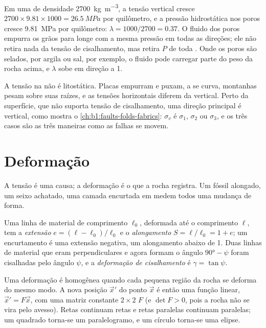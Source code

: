 Em uma  de densidade \qty{2700}{kg.m^{-3}}, a tensão vertical cresce $2700\times9.81\times1000 = \qty{26.5}{MPa}$ por quilômetro, e a pressão hidrostática nos poros cresce \qty{9.81}{MPa} por quilômetro: $\lambda = 1000/2700 = 0.37$. O fluido dos poros empurra os grãos para longe com a mesma pressão em todas as direções; ele não retira nada da tensão de cisalhamento, mas retira $P$ de toda . Onde os poros são selados, por argila ou sal, por exemplo, o fluido pode carregar parte do peso da rocha acima, e $\lambda$ sobe em direção a 1.

A tensão na  não é litostática. Placas empurram e puxam, a  se curva, montanhas pesam sobre suas raízes, e as tensões horizontais diferem da vertical. Perto da superfície, que não suporta tensão de cisalhamento, uma direção principal é vertical, como mostra o \cref{ch:b1:faults-folds-fabrics}: $\sigma_v$ é $\sigma_1$, $\sigma_2$ ou $\sigma_3$, e os três casos são as três maneiras como as falhas se movem.

\section{Deformação}\label{sec:b1:stress-strain-rheology:strain}

A tensão é uma causa; a deformação é o que a rocha registra. Um fóssil alongado, um seixo achatado, uma camada encurtada em  medem todos uma mudança de forma.

\begin{definition}\label{def:b1:stress-strain-rheology:strain}
Uma linha de material de comprimento $\ell_0$, deformada até o comprimento $\ell$, tem a \emph{extensão} $e = (\ell - \ell_0)/\ell_0$ e o \emph{alongamento} $S = \ell/\ell_0 = 1 + e$; um encurtamento é uma extensão negativa, um alongamento abaixo de 1. Duas linhas de material que eram perpendiculares e agora formam o ângulo $\ang{90} - \psi$ foram cisalhadas pelo ângulo $\psi$, e a \emph{deformação de cisalhamento} é $\gamma = \tan\psi$.
\end{definition}

Uma deformação é homogênea quando cada pequena região da rocha se deforma do mesmo modo. A nova posição $\vec x'$ do ponto $\vec x$ é então uma função linear, $\vec x' = F\vec x$, com uma matriz constante $2\times2$ $F$ (e $\det F > 0$, pois a rocha não se vira pelo avesso). Retas continuam retas e retas paralelas continuam paralelas; um quadrado torna-se um paralelogramo, e um círculo torna-se uma elipse.

